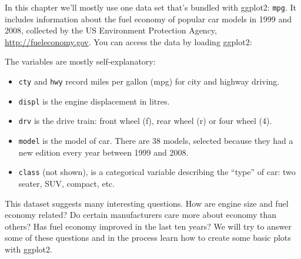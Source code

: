 In this chapter we'll mostly use one data set that's bundled with
ggplot2: \texttt{mpg}. It includes information about the fuel economy of
popular car models in 1999 and 2008, collected by the US Environment
Protection Agency, \url{http://fueleconomy.gov}. You can access the data
by loading ggplot2: 

\begin{Shaded}
\begin{Highlighting}[]
\CommentTok{#> }
\end{Highlighting}
\end{Shaded}

The variables are mostly self-explanatory:

\begin{itemize}
\item
  \texttt{cty} and \texttt{hwy} record miles per gallon (mpg) for city
  and highway driving.
\item
  \texttt{displ} is the engine displacement in litres.
\item
  \texttt{drv} is the drive train: front wheel (f), rear wheel (r) or
  four wheel (4).
\item
  \texttt{model} is the model of car. There are 38 models, selected
  because they had a new edition every year between 1999 and 2008.
\item
  \texttt{class} (not shown), is a categorical variable describing the
  ``type'' of car: two seater, SUV, compact, etc.
\end{itemize}

This dataset suggests many interesting questions. How are engine size
and fuel economy related? Do certain manufacturers care more about
economy than others? Has fuel economy improved in the last ten years? We
will try to answer some of these questions and in the process learn how
to create some basic plots with ggplot2.

